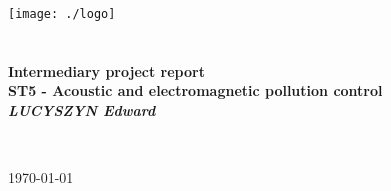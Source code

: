 \begin{titlepage}
\begin{center}

\texttt{[image: ./logo]}~\\[1cm]


\textsc{\Large }\\[0.5cm]

\HRule \\[0.4cm]

{\huge \bfseries Intermediary project report\\
[0.4cm] }
{\large \bfseries ST5 - Acoustic and electromagnetic pollution control\\[0.4cm] }
{\large \bfseries \textit{LUCYSZYN Edward}\\[0.4cm] }


\HRule \\[1.5cm]

\vspace{3cm}


\vfill

{\large \today}

\end{center}
\end{titlepage}